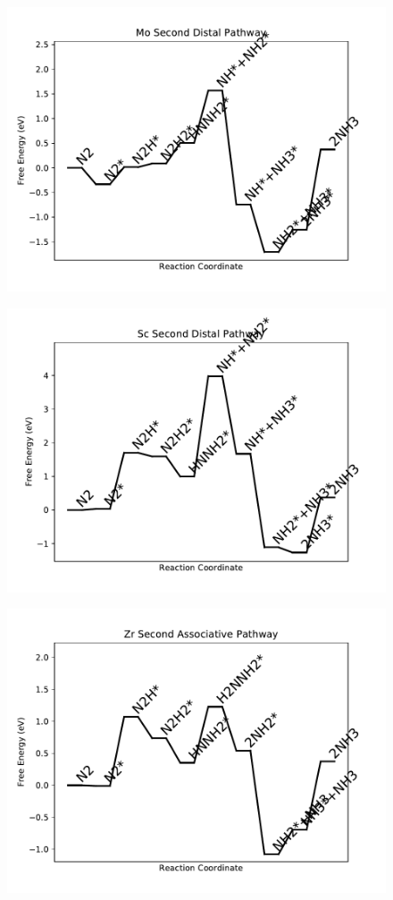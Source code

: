 \begin{figure}
\centering
\includegraphics[width=0.8\linewidth]{data/plots/Mo_distal_2.pdf}
\end{figure}

\begin{figure}
\centering
\includegraphics[width=0.8\linewidth]{data/plots/Sc_distal_2.pdf}
\end{figure}

\begin{figure}
\centering
\includegraphics[width=0.8\linewidth]{data/plots/Zr_associative_2.pdf}
\end{figure}

